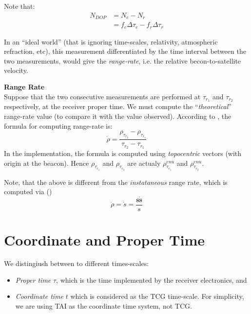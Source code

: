 Note that:
\begin{equation}
  \begin{split}
    N_{DOP} & = N_e - N_r\\
            & = f_e \Delta\tau_e - f_r \Delta\tau_r
  \end{split}
\end{equation}

In an ``ideal world'' (that is ignoring time-scales, relativity, atmospheric 
refraction, etc), this measurement differentiated by the time interval between the 
two measurements, would give the \emph{range-rate}, i.e. the relative becon-to-satellite 
velocity.

\textbf{Range Rate}\\
\label{range-rate}
Suppose that the two consecutive measurements are performed at $\tau_{r_1}$ 
and $\tau_{r_2}$ respectively, at the receiver proper time. We must compute the 
``\emph{theoretical}'' range-rate value (to compare it with the value observed).
According to \cite{Montenbruck2000}, the formula for computing range-rate is:
\begin{equation}
  \dot{\rho} = \frac{\rho_{\tau_{r_2}} - \rho_{\tau_{r_1}}}{\tau_{r_2} - \tau_{r_1}}
\end{equation}
In the implementation, the formula is computed using \emph{topocentric} vectors 
(with origin at the beacon). Hence $\rho_{\tau_{r_1}}$ and $\rho_{\tau_{r_2}}$ are 
actualy $\rho_{\tau_{r_1}}^{enu}$ and $\rho_{\tau_{r_2}}^{enu}$.

Note, that the above is different from the \emph{instataneous} range rate, 
which is computed via (\cite{Montenbruck2000})
\begin{equation}
  \dot{\rho} = \dot{s} = \frac{\bm{s} \bm{\dot{s}}}{s}
\end{equation}

\section{Coordinate and Proper Time}
\label{sec:coordinate-and-proper-time}
We distingiush between to different times-scales:
\begin{itemize}
  \item \emph{Proper time} $\tau$, which is the time implemented by the receiver 
    electronics, and
  \item \emph{Coordinate time} $t$ which is considered as the TCG time-scale.
  {\color{brown}For simplicity, we are using TAI as the coordinate time system, not TCG.}
\end{itemize}

